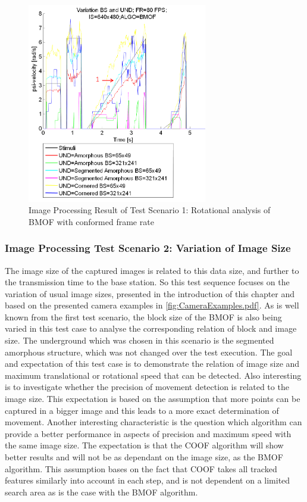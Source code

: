 \begin{figure}[H]
	\centering
		\includegraphics[width=0.70\textwidth]{graphic/Eval_IP_TS1_4.png}
	\caption{Image Processing Result of Test Scenario 1: Rotational analysis of BMOF with conformed frame rate}
	\label{fig:Eval_IP_TS1_4.png}
\end{figure}

\subsubsection{Image Processing Test Scenario 2: Variation of Image Size}
The image size of the captured images is related to this data size, and further to the transmission time to the base station. So this test sequence focuses on the variation of usual image sizes, presented in the introduction of this chapter and based on the presented camera examples in 
\ref{fig:CameraExamples.pdf}. As is well known from the first test scenario, the block size of the \gls{BMOF} is also being varied in this test case to analyse the corresponding relation of block and image size. The underground which was chosen in this scenario is the segmented amorphous structure, which was not changed over the test execution.
The goal and expectation of this test case is to demonstrate the relation of image size and maximum translational or rotational speed that can be detected. Also interesting is to investigate whether the precision of movement detection is related to the image size. This expectation is based on the assumption that more points can be captured in a bigger image and this leads to a more exact determination of movement.
Another interesting characteristic is the question which algorithm can provide a better performance in aspects of precision and maximum speed with the same image size. The expectation is that the \gls{COOF} algorithm will show better results and will not be as dependant on the image size, as the \gls{BMOF} algorithm. This assumption bases on the fact that \gls{COOF} takes all tracked features similarly into account in each step, and is not dependent on a limited search area as is the case with the \gls{BMOF} algorithm.

